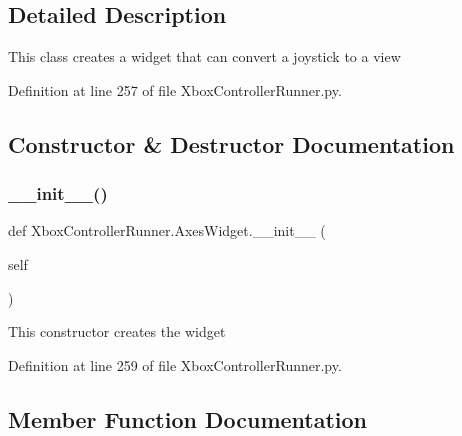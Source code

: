 \subsection{Detailed Description}
\begin{DoxyVerb}This class creates a widget that can convert a joystick to a view\end{DoxyVerb}
 

Definition at line 257 of file Xbox\+Controller\+Runner.\+py.



\subsection{Constructor \& Destructor Documentation}
\mbox{\label{class_xbox_controller_runner_1_1_axes_widget_a8ae5f6ee023fcdb5f33229f32242657f}} 
\subsubsection{\texorpdfstring{\+\_\+\+\_\+init\+\_\+\+\_\+()}{\_\_init\_\_()}}
{\footnotesize\ttfamily def Xbox\+Controller\+Runner.\+Axes\+Widget.\+\_\+\+\_\+init\+\_\+\+\_\+ (\begin{DoxyParamCaption}\item[{}]{self }\end{DoxyParamCaption})}

\begin{DoxyVerb}This constructor creates the widget\end{DoxyVerb}
 

Definition at line 259 of file Xbox\+Controller\+Runner.\+py.



\subsection{Member Function Documentation}
\mbox{\label{class_xbox_controller_runner_1_1_axes_widget_adba705012381f09a85512c77f43c71ca}} 
